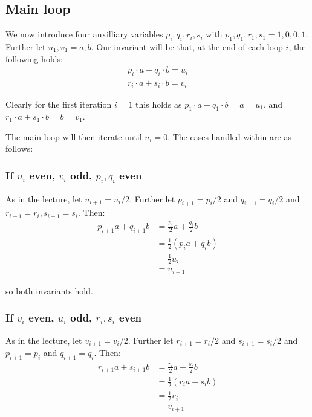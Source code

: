 \documentclass[a4paper]{scrreprt}
\begin{document}
\subsection{Main loop}

We now introduce four auxilliary variables $p_i, q_i, r_i, s_i$ with $p_1, q_1,
r_1, s_1 = 1, 0, 0, 1$. Further let $u_1, v_1 = a, b$. Our invariant will be
that, at the end of each loop $i$, the following holds:
\begin{align*}
		p_i \cdot a + q_i \cdot b = u_i \\
		r_i \cdot a + s_i \cdot b = v_i
\end{align*}

Clearly for the first iteration $i = 1$ this holds as $p_1 \cdot a + q_1 \cdot
b = a = u_1$, and $r_1 \cdot a + s_1 \cdot b = b = v_1$.

The main loop will then iterate until $u_i = 0$. The cases handled within
are as follows:

\subsubsection{If $u_i$ even, $v_i$ odd, $p_i, q_i$ even}

As in the lecture, let $u_{i+1} = u_i / 2$. Further let $p_{i+1} = p_{i} / 2$
and $q_{i+1} = q_{i} / 2$ and $r_{i+1} = r_i, s_{i+1} = s_i$. Then:
\begin{align*}
		p_{i+1} a + q_{i+1} b & = \frac{p_i}{2} a + \frac{q_i}{2} b \\
							  & = \frac{1}{2} (p_i a + q_i b) \\
							  & = \frac{1}{2} u_i \\
							  & = u_{i+1}
\end{align*}

so both invariants hold.

\subsubsection{If $v_i$ even, $u_i$ odd, $r_i, s_i$ even}

As in the lecture, let $v_{i+1} = v_i / 2$. Further let $r_{i+1} = r_{i} / 2$
and $s_{i+1} = s_{i} / 2$ and $p_{i+1} = p_i$ and $q_{i+1} = q_i$. Then:
\begin{align*}
		r_{i+1} a + s_{i+1} b & = \frac{r_i}{2} a + \frac{s_i}{2} b \\
							  & = \frac{1}{2} (r_i a + s_i b) \\
							  & = \frac{1}{2} v_i \\
							  & = v_{i+1}
\end{align*}
\end{document}
